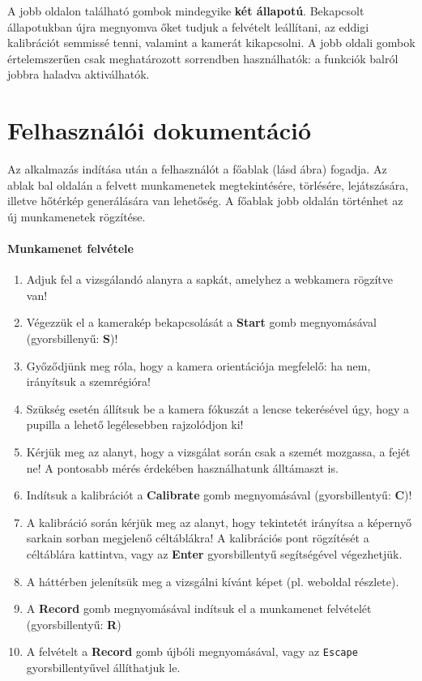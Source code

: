 \bigskip

A jobb oldalon található gombok mindegyike \textbf{két állapotú}. Bekapcsolt állapotukban újra megnyomva őket tudjuk a felvételt leállítani, az eddigi kalibrációt semmissé tenni, valamint a kamerát kikapcsolni. A jobb oldali gombok értelemszerűen csak meghatározott sorrendben használhatók: a funkciók balról jobbra haladva aktiválhatók.

\newpage
\section{Felhasználói dokumentáció}\label{sect:docs}

Az alkalmazás indítása után a felhasználót a főablak (lásd  ábra) fogadja. Az ablak bal oldalán a felvett munkamenetek megtekintésére, törlésére, lejátszására, illetve hőtérkép generálására van lehetőség. A főablak jobb oldalán történhet az új munkamenetek rögzítése.

\paragraph{Munkamenet felvétele}

\begin{enumerate}
  \item Adjuk fel a vizsgálandó alanyra a sapkát, amelyhez a webkamera rögzítve van!
  \item Végezzük el a kamerakép bekapcsolását a \textbf{Start} gomb megnyomásával (gyorsbillenyű: \textbf{S})!
  \item Győződjünk meg róla, hogy a kamera orientációja megfelelő: ha nem, irányítsuk a szemrégióra!
  \item Szükség esetén állítsuk be a kamera fókuszát a lencse tekerésével úgy, hogy a pupilla a lehető legélesebben rajzolódjon ki!
  \item Kérjük meg az alanyt, hogy a vizsgálat során csak a szemét mozgassa, a fejét ne! A pontosabb mérés érdekében használhatunk álltámaszt is.
  \item Indítsuk a kalibrációt a \textbf{Calibrate} gomb megnyomásával (gyorsbillentyű: \textbf{C})!
  \item A kalibráció során kérjük meg az alanyt, hogy tekintetét irányítsa a képernyő sarkain sorban megjelenő céltáblákra! A kalibrációs pont rögzítését a céltáblára kattintva, vagy az \textbf{Enter} gyorsbillentyű segítségével végezhetjük.
  \item A háttérben jelenítsük meg a vizsgálni kívánt képet (pl. weboldal részlete).
  \item A \textbf{Record} gomb megnyomásával indítsuk el a munkamenet felvételét (gyorsbillentyű: \textbf{R})
  \item A felvételt a \textbf{Record} gomb újbóli megnyomásával, vagy az \texttt{Escape} gyorsbillentyűvel állíthatjuk le.
\end{enumerate}


